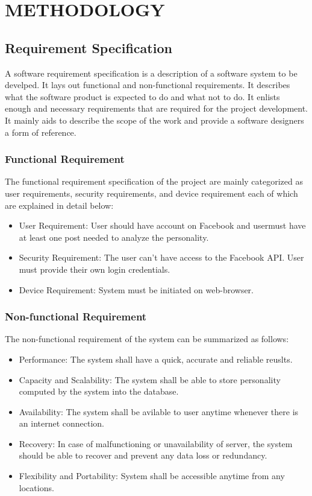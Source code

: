 \newpage
\section{METHODOLOGY}

\subsection{Requirement Specification}
A software requirement specification is a description of a software system to be develped. It lays out functional and non-functional requirements. It describes what the software product is expected to do and what not to do. It enlists enough and necessary requirements that are required for the project development. It mainly aids to describe the scope of the work and provide a software designers a form of reference.
\subsubsection{Functional Requirement}
The functional requirement specification of the project are mainly categorized as user requirements, security requirements, and device requirement each of which are explained in detail below:
\begin{itemize}
\item User Requirement: User should have account on Facebook and usermust have at least one post needed to analyze the personality.
\item Security Requirement: The user can't have access to the Facebook API. User must provide their own login credentials.
\item Device Requirement: System must be initiated on web-browser.

\end{itemize}
\subsubsection{Non-functional Requirement}
The non-functional requirement of the system can be summarized as follows:
\begin{itemize}
\item Performance: The system shall have a quick, accurate and reliable reuslts.
\item Capacity and Scalability: The system shall be able to store personality computed by the system into the database.
\item Availability: The system shall be avilable to user anytime whenever there is an internet connection.
\item Recovery: In case of malfunctioning or unavailability of server, the system should be able to recover and prevent any data loss or redundancy.
\item Flexibility and Portability: System shall be accessible anytime from any locations. 
\end{itemize}
